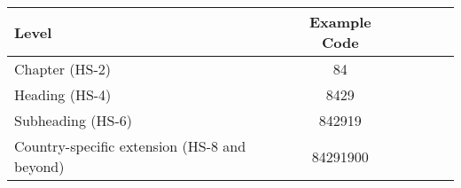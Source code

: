 \begin{tabular}{lccccc} \hline \centering
Level & Example Code \\ \hline
Chapter (HS-2) & 84\\
Heading (HS-4) & 8429\\
Subheading (HS-6) & 842919\\
Country-specific extension (HS-8 and beyond) & 84291900\\ \hline
\end{tabular}